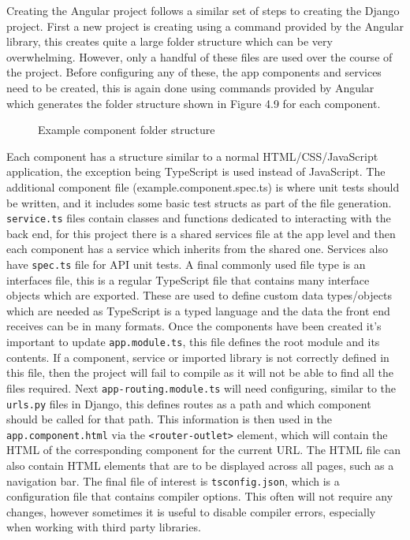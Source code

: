 Creating the Angular project follows a similar set of steps to creating the Django project. First a new project is creating using a command 
provided by the Angular library, this creates quite a large folder structure which can be very overwhelming. However, only a handful of these files 
are used over the course of the project. Before configuring any of these, the app components and services need to be created, this is again done using commands provided 
by Angular which generates the folder structure shown in Figure 4.9 for each component.
\begin{figure}[!htbp]
    \caption{Example component folder structure}
\end{figure}
Each component has a structure similar to a normal HTML/CSS/JavaScript application, the exception being TypeScript is used instead of JavaScript.
The additional component file (example.component.spec.ts) is where unit tests should be written, and it includes some basic test structs as part of the 
file generation. \verb|service.ts| files contain classes and functions dedicated to interacting with the back end, for this project there is a shared services file at 
the app level and then each component has a service which inherits from the shared one. Services also have \verb|spec.ts| file for API unit tests.
A final commonly used file type is an interfaces file, this is a regular TypeScript file that contains many interface objects which are exported. 
These are used to define custom data types/objects which are needed as TypeScript is a typed language and the data the front end receives can be in many formats.
Once the components have been created it's important to update \verb|app.module.ts|, this file defines the root module and its contents. 
If a component, service or imported library is not correctly defined in this file, then the project will fail to compile as it will not be able to find all the files required.
Next \verb|app-routing.module.ts| will need configuring, similar to the \verb|urls.py| files in Django, this defines routes as a path and which component should be called for that path.
This information is then used in the \verb|app.component.html| via the \verb|<router-outlet>| element, which will contain the HTML of the corresponding component for the current URL.
The HTML file can also contain HTML elements that are to be displayed across all pages, such as a navigation bar.
The final file of interest is \verb|tsconfig.json|, which is a configuration file that contains compiler options. This often will not require any changes, however 
sometimes it is useful to disable compiler errors, especially when working with third party libraries.


